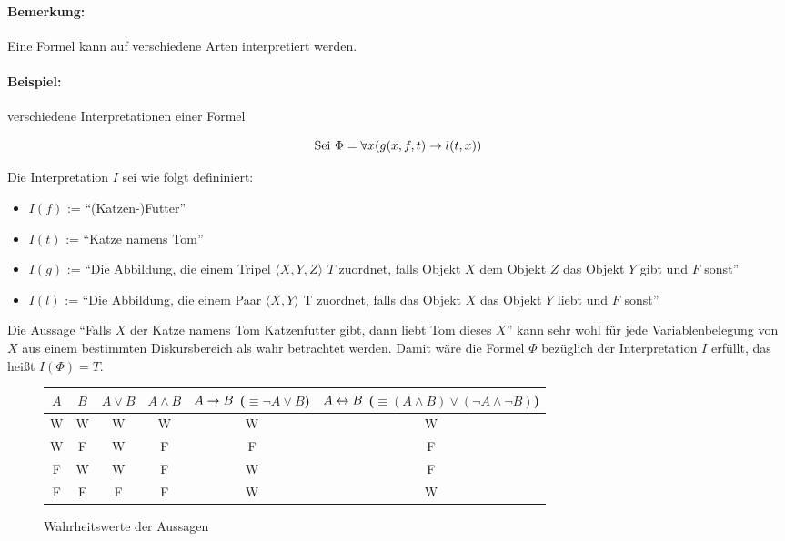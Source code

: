 \documentclass[a4paper]{scrartcl}
\begin{document}
\paragraph{Bemerkung:} Eine Formel kann auf verschiedene Arten interpretiert werden.

\paragraph{Beispiel:} verschiedene Interpretationen einer Formel

$$\text{Sei }\Phi = \forall x(g(x,f,t) \rightarrow l(t,x))$$

Die Interpretation $I$ sei wie folgt defininiert:

\begin{itemize}
\item $I(f)$ := "`(Katzen-)Futter"'
\item $I(t)$ := "`Katze namens Tom"'
\item $I(g)$ := "`Die Abbildung, die einem Tripel $\langle X,Y,Z\rangle$ $T$ zuordnet, falls Objekt $X$ dem Objekt $Z$ das Objekt $Y$ gibt und $F$ sonst"'
\item $I(l)$ := "`Die Abbildung, die einem Paar $\langle X,Y \rangle$ T zuordnet, falls das Objekt $X$ das Objekt $Y$ liebt und $F$ sonst"'
\end{itemize}

Die Aussage "`Falls $X$ der Katze namens Tom Katzenfutter gibt, dann liebt Tom dieses $X$"' kann sehr wohl für jede Variablenbelegung von $X$ aus einem bestimmten Diskursbereich als wahr betrachtet werden. Damit wäre die Formel $\Phi$ bezüglich der Interpretation $I$ erfüllt, das heißt $I(\Phi) = T$.

\begin{figure}[htb]
	\centering
	\begin{tabular}{|c|c|c|c|c|c|}
		\hline
		$A$	&	$B$	&	$A \vee B$ & $A \wedge B$ & $A \rightarrow B$ ($\equiv\neg A \vee B$) &
		$A \leftrightarrow B$ ($\equiv (A\wedge B) \vee (\neg A \wedge \neg B)$) \\
		\hline
		W	&W	&W	&W	&W	&W	\\
		W	&F	&W	&F	&F	&F	\\
		F	&W	&W	&F	&W	&F	\\
		F	&F	&F	&F	&W	&W	\\
		\hline
	\end{tabular}
	\caption{Wahrheitswerte der Aussagen}
\end{figure}

\end{document}
